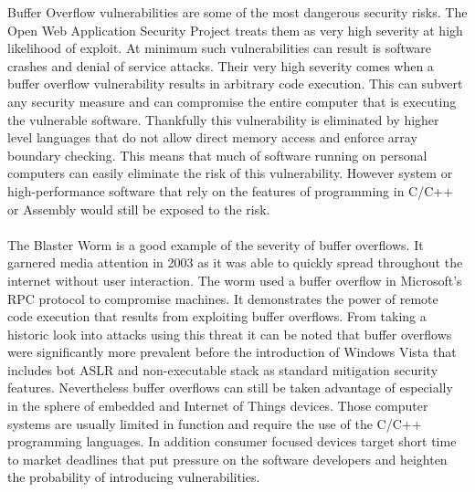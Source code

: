 Buffer Overflow vulnerabilities are some of the most dangerous security risks. The Open Web Application Security Project \cite{owasp} treats them as very high severity at high likelihood of exploit. At minimum such vulnerabilities can result is software crashes and denial of service attacks. Their very high severity comes when a buffer overflow vulnerability results in arbitrary code execution. This can subvert any security measure and can compromise the entire computer that is executing the vulnerable software. Thankfully this vulnerability is eliminated by higher level languages that do not allow direct memory access and enforce array boundary checking. This means that much of software running on personal computers can easily eliminate the risk of this vulnerability. However system or high-performance software that rely on the features of programming in C/C++ or Assembly would still be exposed to the risk. \\ \\
The Blaster Worm\cite{balster_cert} is a good example of the severity of buffer overflows. It garnered media attention in 2003 as it was able to quickly spread throughout the internet without user interaction. The worm used a buffer overflow in Microsoft's RPC protocol to compromise machines. It demonstrates the power of remote code execution that results from exploiting buffer overflows. From taking a historic look into attacks using this threat it can be noted that buffer overflows were significantly more prevalent before the introduction of Windows Vista that includes bot ASLR and non-executable stack as standard mitigation security features. Nevertheless buffer overflows can still be taken advantage of especially in the sphere of embedded and Internet of Things devices. Those computer systems are usually limited in function and require the use of the C/C++ programming languages. In addition consumer focused devices target short time to market deadlines that put pressure on the software developers and heighten the probability of introducing vulnerabilities. \\ \\
